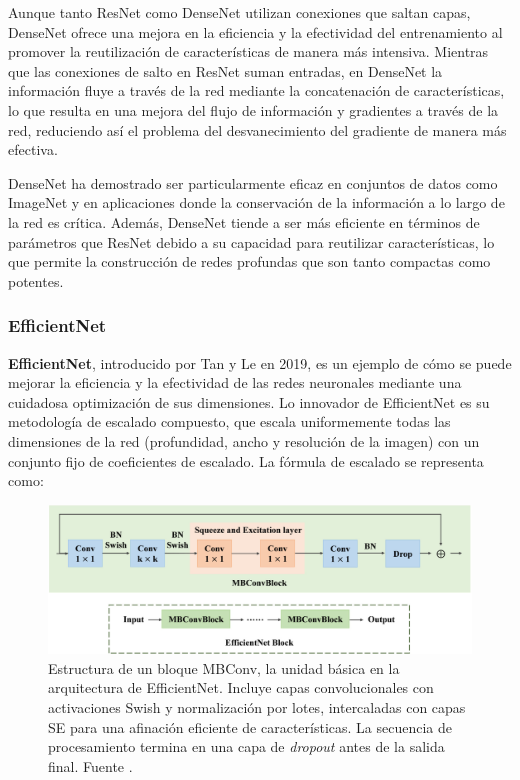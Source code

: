 Aunque tanto ResNet como DenseNet utilizan conexiones que saltan capas, DenseNet ofrece una mejora en la eficiencia y la efectividad del entrenamiento al promover la reutilización de características de manera más intensiva. Mientras que las conexiones de salto en ResNet suman entradas, en DenseNet la información fluye a través de la red mediante la concatenación de características, lo que resulta en una mejora del flujo de información y gradientes a través de la red, reduciendo así el problema del desvanecimiento del gradiente de manera más efectiva.

DenseNet ha demostrado ser particularmente eficaz en conjuntos de datos como ImageNet y en aplicaciones donde la conservación de la información a lo largo de la red es crítica. Además, DenseNet tiende a ser más eficiente en términos de parámetros que ResNet debido a su capacidad para reutilizar características, lo que permite la construcción de redes profundas que son tanto compactas como potentes.

\subsubsection{EfficientNet}

\textbf{EfficientNet}, introducido por Tan y Le en 2019, es un ejemplo de cómo se puede mejorar la eficiencia y la efectividad de las redes neuronales mediante una cuidadosa optimización de sus dimensiones. Lo innovador de EfficientNet es su metodología de escalado compuesto, que escala uniformemente todas las dimensiones de la red (profundidad, ancho y resolución de la imagen) con un conjunto fijo de coeficientes de escalado. La fórmula de escalado se representa como:

\begin{figure}
	\centering
	\includegraphics[width=140mm]{img/mbconv.jpg}
	\caption{Estructura de un bloque MBConv, la unidad básica en la arquitectura de EfficientNet.  Incluye capas convolucionales con activaciones Swish y normalización por lotes, intercaladas con capas SE para una afinación eficiente de características. La secuencia de procesamiento termina en una capa de \textit{dropout} antes de la salida final. Fuente \cite{TANG2024105605}.}
\end{figure}

